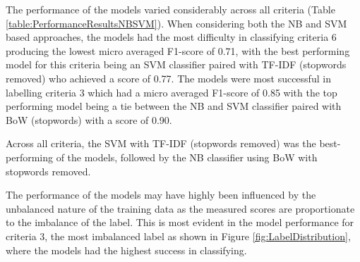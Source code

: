 \documentclass[a4paper,twoside,phd]{BYUPhys}
\begin{document}
The performance of the models varied considerably across all criteria (Table \ref{table:PerformanceResultsNBSVM}). When considering both the NB and SVM based approaches, the models had the most difficulty in classifying criteria 6 producing the lowest micro averaged F1-score of 0.71, with the best performing model for this criteria being an SVM classifier paired with TF-IDF (stopwords removed) who achieved a score of 0.77. The models were most successful in labelling criteria 3 which had a micro averaged F1-score of 0.85 with the top performing model being a tie between the NB and SVM classifier paired with BoW (stopwords) with a score of 0.90. \newline

Across all criteria, the SVM with TF-IDF (stopwords removed) was the best-performing of the models, followed by the NB classifier using BoW with stopwords removed. \newline

The performance of the models may have highly been influenced by the unbalanced nature of the training data as the measured scores are proportionate to the imbalance of the label. This is most evident in the model performance for criteria 3, the most imbalanced label as shown in Figure \ref{fig:LabelDistribution}, where the models had the highest success in classifying. \newline
\end{document}
